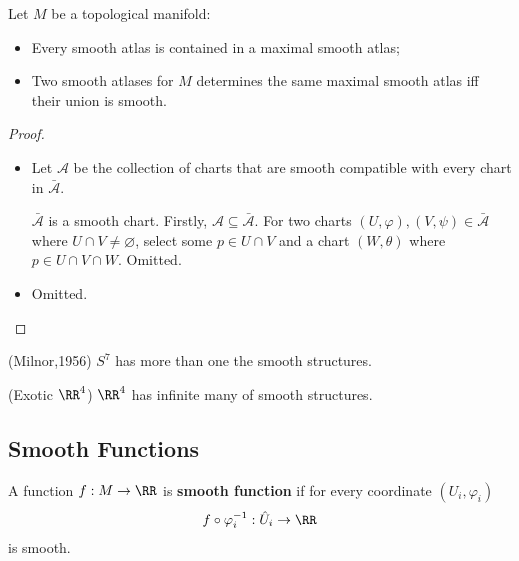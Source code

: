 \documentclass[Total.tex]{subfiles}
\begin{document}
			\begin{lemma} Let $M$ be a topological manifold:
				\begin{itemize}
					\item Every smooth atlas is contained in a maximal smooth atlas;
					\item Two smooth atlases for $M$ determines the same maximal smooth atlas iff their union is smooth.
				\end{itemize}
			\end{lemma}
			\begin{proof}
				\begin{itemize}
					\item Let $\mathcal{A}$ be the collection of charts that are smooth compatible with every chart in $\bar{\mathcal{A}}$. 
					
					 $\bar{\mathcal{A}}$ is a smooth chart. Firstly, $\mathcal{A}\subseteq \bar{\mathcal{A}}$. For two charts $(U,\varphi),(V,\psi)\in \bar{\mathcal{A}}$ where $U\cap V\not=\varnothing$, select some $p\in U\cap V$ and a chart $(W,\theta)$ where $p\in U\cap V\cap W$. Omitted.
					\item Omitted.
				\end{itemize}
			\end{proof}
			
			\begin{theorem}
				(Milnor,1956) $S^7$ has more than one the smooth structures.
			\end{theorem}
			\begin{theorem}
				(Exotic $\RR^4$) $\RR^4$ has infinite many of smooth structures.
			\end{theorem}
			
			\subsection{Smooth Functions}
			\begin{Def}
				A function $f:M\rightarrow \RR$ is \textbf{smooth function} if for every coordinate $(U_i,\varphi_i)$
				\begin{gather*}
					f\circ \varphi_i^{-1}:\hat{U}_i\rightarrow \RR
				\end{gather*} 
				is smooth.
			\end{Def}
\end{document}
